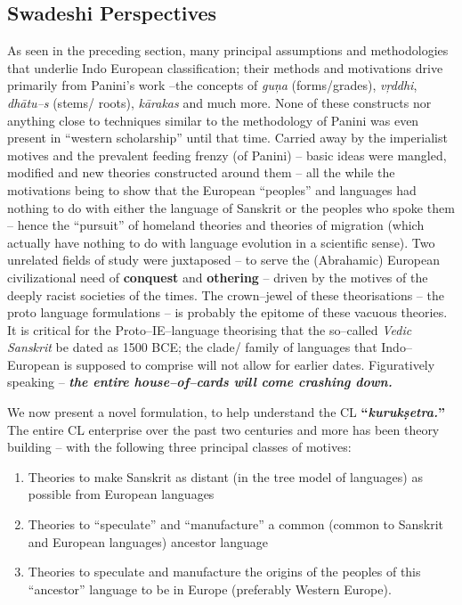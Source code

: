 \subsection*{Swadeshi Perspectives}

As seen in the preceding section, many principal assumptions and methodologies that underlie Indo European classification; their methods and motivations drive primarily from Panini’s work –the concepts of \textit{guņa} (forms/grades), \textit{vŗddhi}, \textit{dhātu–s} (stems/ roots), \textit{kārakas} and much more. None of these constructs nor anything close to techniques similar to the methodology of Panini was even present in “western scholarship” until that time. Carried away by the imperialist motives and the prevalent feeding frenzy (of Panini) – basic ideas were mangled, modified and new theories constructed around them – all the while the motivations being to show that the European “peoples” and languages had nothing to do with either the language of Sanskrit or the peoples who spoke them – hence the “pursuit” of homeland theories and theories of migration (which actually have nothing to do with language evolution in a scientific sense). Two unrelated fields of study were juxtaposed – to serve the (Abrahamic) European civilizational need of \textbf{conquest} and \textbf{othering} – driven by the motives of the deeply racist societies of the times. The crown–jewel of these theorisations – the proto language formulations – is probably the epitome of these vacuous theories. It is critical for the Proto–IE–language theorising that the so–called \textit{Vedic Sanskrit} be dated as 1500 BCE; the clade/ family of languages that Indo–European is supposed to comprise will not allow for earlier dates. Figuratively speaking – \textbf{\textit{the entire house–of–cards will come crashing down.}}

We now present a novel formulation, to help understand the CL \textbf{“\textit{kurukṣetra.}”} The entire CL enterprise over the past two centuries and more has been theory building – with the following three principal classes of motives:

\begin{enumerate}[{\rm 1)}]
\itemsep=0pt
\item Theories to make Sanskrit as distant (in the tree model of languages) as possible from European languages

 \item Theories to “speculate” and “manufacture” a common (common to Sanskrit and European languages) ancestor language

 \newpage


 \item Theories to speculate and manufacture the origins of the peoples of this “ancestor” language to be in Europe (preferably Western Europe). 

\end{enumerate}

